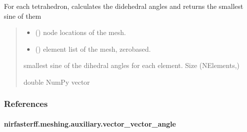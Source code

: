 \documentclass[letterpaper,10pt,english]{sphinxmanual}
\begin{document}
\begin{fulllineitems}
\label{\detokenize{_autosummary/nirfasterff.meshing.auxiliary.simpqual:nirfasterff.meshing.auxiliary.simpqual}}
\pysigstartsignatures
{}
\pysigstopsignatures
\sphinxAtStartPar
For each tetrahedron, calculates the didehedral angles and returns the smallest sine of them
\begin{quote}\begin{description}
\begin{itemize}
\item {} 
\sphinxAtStartPar
{} () \textendash{} node locations of the mesh.

\item {} 
\sphinxAtStartPar
{} () \textendash{} element list of the mesh, zero\sphinxhyphen{}based.

\end{itemize}

\sphinxAtStartPar
smallest sine of the dihedral angles for each element. Size (NElements,)

\sphinxAtStartPar
double NumPy vector

\end{description}\end{quote}
\subsubsection*{References}

\sphinxAtStartPar
{}

\end{fulllineitems}


\sphinxstepscope


\paragraph{nirfasterff.meshing.auxiliary.vector\_vector\_angle}
\label{\detokenize{_autosummary/nirfasterff.meshing.auxiliary.vector_vector_angle:nirfasterff-meshing-auxiliary-vector-vector-angle}}\label{\detokenize{_autosummary/nirfasterff.meshing.auxiliary.vector_vector_angle::doc}}
\end{document}
